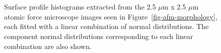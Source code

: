 \documentclass[
  a4paper,
]{scrbook}
\begin{document}
\begin{figure}
\begin{minipage}[t]{0.47\linewidth}
{{}

}

\end{minipage}%
\newline
\begin{minipage}[t]{0.26\linewidth}

{\centering 

~

}

\end{minipage}%
%
\begin{minipage}[t]{0.47\linewidth}

{\centering 


}

\end{minipage}%
%
\begin{minipage}[t]{0.26\linewidth}

{\centering 

~

}

\end{minipage}%

\caption{\label{fig-afm-histograms}Surface profile histograms extracted
from the 2.5 \(\mu\)m x 2.5 \(\mu\)m atomic force microscope images seen
in Figure~\ref{fig-afm-morphology}, each fitted with a linear
combination of normal distributions. The component normal distributions
corresponding to each linear combination are also shown.}

\end{figure}
\end{document}
